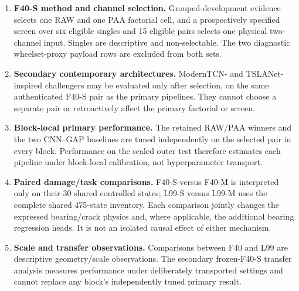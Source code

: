 \begin{enumerate}
  \item \textbf{F40-S method and channel selection.} Grouped-development
  evidence selects one RAW and one PAA factorial cell, and a prospectively
  specified screen over six eligible singles and 15 eligible pairs selects one
  physical two-channel input. Singles are descriptive and non-selectable.
  The two diagnostic wheelset-proxy payload rows are excluded from both sets.
  \item \textbf{Secondary contemporary architectures.} ModernTCN- and
  TSLANet-inspired challengers may be evaluated only after selection, on the
  same authenticated F40-S pair as the primary pipelines. They cannot choose a
  separate pair or retroactively affect the primary factorial or screen.
  \item \textbf{Block-local primary performance.} The retained RAW/PAA winners
  and the two CNN--GAP baselines are tuned independently on the selected pair
  in every block. Performance on the sealed outer test therefore estimates each
  pipeline under block-local calibration, not hyperparameter transport.
  \item \textbf{Paired damage/task comparisons.} F40-S versus F40-M is
  interpreted only on their 30 shared controlled states; L99-S versus L99-M
  uses the complete shared 475-state inventory. Each comparison jointly
  changes the expressed bearing/crack physics and, where applicable, the
  additional bearing regression heads. It is not an isolated causal effect of
  either mechanism.
  \item \textbf{Scale and transfer observations.} Comparisons between F40 and
  L99 are descriptive geometry/scale observations. The secondary frozen-F40-S
  transfer analysis measures performance under deliberately transported
  settings and cannot replace any block's independently tuned primary result.
\end{enumerate}

